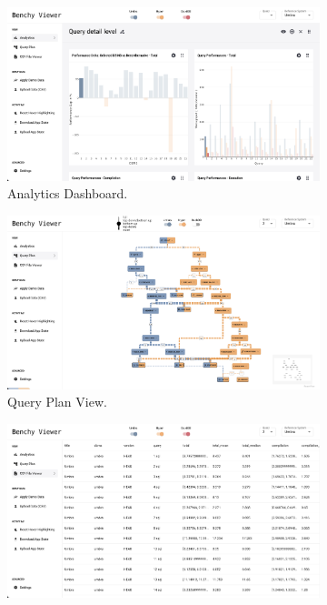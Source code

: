 \chapter{\abstractname}

\begin{figure}[h]
    \centering
    \begin{subfigure}[b]{0.3\linewidth}
      \includegraphics[width=\linewidth]{figures/app.png}
      \caption{Analytics Dashboard.}
        \label{fig:abstract-page}
    \end{subfigure}
    \hspace{0.5cm} %
    \begin{subfigure}[b]{0.3\linewidth}
      \includegraphics[width=\linewidth]{figures/app-query-plan.png}
      \caption{Query Plan View.}
        \label{fig:abstract-query-plan}
    \end{subfigure}
    \hspace{0.5cm} %
    \begin{subfigure}[b]{0.3\linewidth}
      \includegraphics[width=\linewidth]{figures/app-data-viewer.png}

\end{subfigure}
\end{figure}

